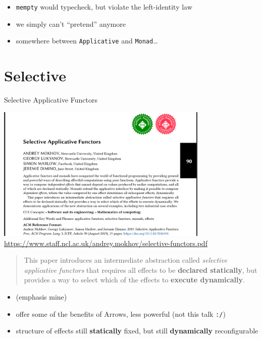 \documentclass[aspectratio=169]{beamer}
\begin{document}
\begin{frame}[fragile]
  \begin{itemize}
  \item \texttt{mempty} would typecheck, but violate the left-identity law
  \item we simply can't ``pretend'' anymore
  \item somewhere between \texttt{Applicative} and \texttt{Monad}\ldots
  \end{itemize}
\end{frame}

\section{Selective}
\begin{frame}
  \begin{center}
    \Huge Selective Applicative Functors
  \end{center}
\end{frame}

\begin{frame}[fragile]
  \begin{center}
    \includegraphics[width=0.76\textwidth]{static-images/selective-applicative-functors-paper.jpg}
    \vfill
    \href{https://www.staff.ncl.ac.uk/andrey.mokhov/selective-functors.pdf}{https://www.staff.ncl.ac.uk/andrey.mokhov/selective-functors.pdf}
  \end{center}
\end{frame}

\begin{frame}
    \begin{quote}
    This paper introduces an intermediate abstraction called
    \textit{selective applicative functors} that requires all effects
    to be \textbf{declared statically}, but provides a way to select which of
    the effects to \textbf{execute dynamically}.
  \end{quote}

  \begin{itemize}
  \item (emphasis mine)
  \item offer some of the benefits of Arrows, less powerful (not this talk \texttt{:/})
  \item structure of effects still \textbf{statically} fixed, but still \textbf{dynamically} reconfigurable
  \end{itemize}
\end{frame}
\end{document}
